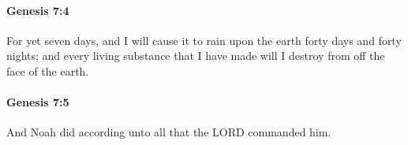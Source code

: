 		\paragraph{Genesis 7:4} %
			\label{GENESIS-7-4}

			For yet seven days, and I will cause it to rain upon the earth forty days and forty nights; and every living substance that I have made will I destroy from off the face of the earth.


		\paragraph{Genesis 7:5} %
			\label{GENESIS-7-5}

			And Noah did according unto all that the LORD commanded him.



